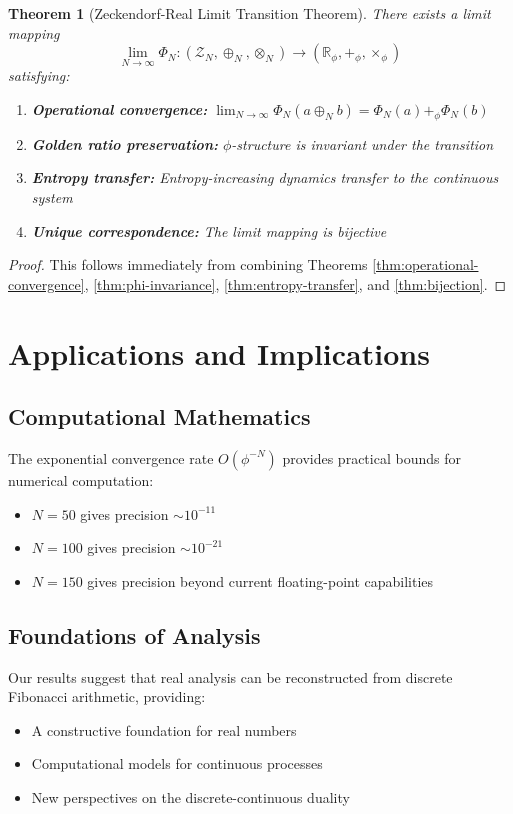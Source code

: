 \documentclass[12pt]{article}
\theoremstyle{plain}
\newtheorem{theorem}{Theorem}[section]
\theoremstyle{definition}
\begin{document}
\begin{theorem}[Zeckendorf-Real Limit Transition Theorem]
\label{thm:main-transition}
There exists a limit mapping
$$\lim_{N \to \infty} \Phi_N: (\mathcal{Z}_N, \oplus_N, \otimes_N) \to (\mathbb{R}_\phi, +_\phi, \times_\phi)$$
satisfying:
\begin{enumerate}
\item \textbf{Operational convergence:} $\lim_{N \to \infty} \Phi_N(a \oplus_N b) = \Phi_N(a) +_\phi \Phi_N(b)$
\item \textbf{Golden ratio preservation:} $\phi$-structure is invariant under the transition
\item \textbf{Entropy transfer:} Entropy-increasing dynamics transfer to the continuous system
\item \textbf{Unique correspondence:} The limit mapping is bijective
\end{enumerate}
\end{theorem}

\begin{proof}
This follows immediately from combining Theorems \ref{thm:operational-convergence}, \ref{thm:phi-invariance}, \ref{thm:entropy-transfer}, and \ref{thm:bijection}.
\end{proof}

\section{Applications and Implications}

\subsection{Computational Mathematics}

The exponential convergence rate $O(\phi^{-N})$ provides practical bounds for numerical computation:
\begin{itemize}
\item $N = 50$ gives precision $\sim 10^{-11}$
\item $N = 100$ gives precision $\sim 10^{-21}$
\item $N = 150$ gives precision beyond current floating-point capabilities
\end{itemize}

\subsection{Foundations of Analysis}

Our results suggest that real analysis can be reconstructed from discrete Fibonacci arithmetic, providing:
\begin{itemize}
\item A constructive foundation for real numbers
\item Computational models for continuous processes
\item New perspectives on the discrete-continuous duality
\end{itemize}
\end{document}
